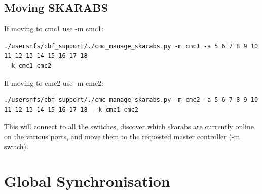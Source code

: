 \subsection{Moving SKARABS}
If moving to cmc1 use -m cmc1:
\begin{lstlisting}[style=DOS]
./usersnfs/cbf_support/./cmc_manage_skarabs.py -m cmc1 -a 5 6 7 8 9 10 11 12 13 14 15 16 17 18 
 -k cmc1 cmc2
\end{lstlisting}
If moving to cmc2 use -m cmc2:
\begin{lstlisting}[style=DOS]
./usersnfs/cbf_support/./cmc_manage_skarabs.py -m cmc2 -a 5 6 7 8 9 10 11 12 13 14 15 16 17 18  -k cmc1 cmc2
\end{lstlisting}




This will connect to all the switches, discover which skarabs are currently online on the various ports, and move them to the requested master controller (-m switch).



\section{Global Synchronisation}

